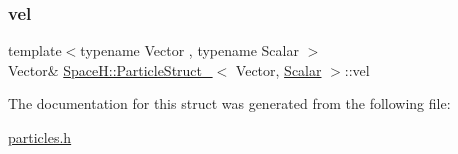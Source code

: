 \subsubsection{\texorpdfstring{vel}{vel}}
{\footnotesize\ttfamily template$<$typename Vector , typename Scalar $>$ \\
Vector\& \mbox{\hyperlink{struct_space_h_1_1_particle_struct__}{Space\+H\+::\+Particle\+Struct\+\_\+}}$<$ Vector, \mbox{\hyperlink{create_kepler_8cpp_a8c2981f3f834be9448a6ab06c28748eb}{Scalar}} $>$\+::vel}



The documentation for this struct was generated from the following file\+:\begin{DoxyCompactItemize}
\item 
\mbox{\hyperlink{particles_8h}{particles.\+h}}\end{DoxyCompactItemize}
